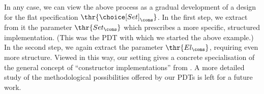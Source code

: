 In any case, we can view the above process as a gradual development of a
design for the flat specification $\thr{\choice[Set]_\cons}$. In the first
step, we extract from it the parameter $\thr{Set_\cons}$ which prescribes a
more specific, structured implementation. (This was the PDT {} with
which we started the above example.) In the second step, we again extract
the parameter $\thr{El_\cons}$, requiring even more structure. Viewed in this
way, our setting gives a concrete specialisation of the general concept of
``constructor implementations'' from \cite{para1}. A more detailed study of
the methodological possibilities offered by our PDTs is left for a future work.
